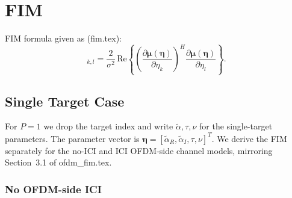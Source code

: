 \documentclass[11pt]{article}
\begin{document}
\section{FIM}
FIM formula given as (fim.tex):
\begin{equation}
    [\bm{J}(\bm{\eta})]_{k,l} = \frac{2}{\sigma^2}\,
    \text{Re}\!\left\{ \left(\frac{\partial \bm{\mu}(\bm{\eta})}{\partial \eta_k}\right)^H
    \frac{\partial \bm{\mu}(\bm{\eta})}{\partial \eta_l} \right\}.
\end{equation}

\subsection{Single Target Case}

For \(P=1\) we drop the target index and write
\(\tilde{\alpha},\tau,\nu\) for the single-target parameters. The
parameter vector is
\(\bm{\eta} = [\tilde{\alpha}_R, \tilde{\alpha}_I, \tau, \nu]^T\). We
derive the FIM separately for the no-ICI and ICI OFDM-side channel
models, mirroring Section~3.1 of ofdm\_fim.tex.

\subsubsection{No OFDM-side ICI}
\end{document}
